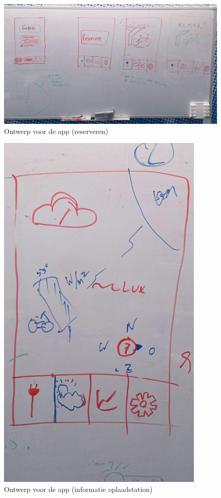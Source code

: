 \begin{figure}[htbp]
\centering
\includegraphics[width=15cm]{images/html_idee_1.jpg}
\caption{Ontwerp voor de app (reserveren)}\label{fig:html_idee_1}
\end{figure}

\begin{figure}[htbp]
\centering
\includegraphics[width=10cm]{images/html_idee_2.jpg}
\caption{Ontwerp voor de app (informatie oplaadstation)}\label{fig:html_idee_2}
\end{figure}

